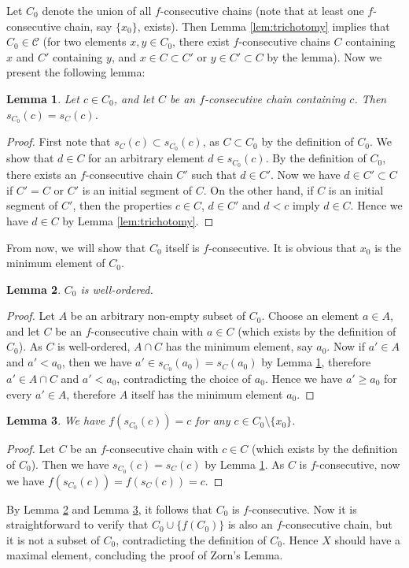 \documentclass{article}
\newtheorem{lemma}{Lemma}
\begin{document}
Let $C_0$ denote the union of all $f$-consecutive chains (note that at least one $f$-consecutive chain, say $\{x_0\}$, exists).
Then Lemma \ref{lem:trichotomy} implies that $C_0 \in \mathcal{C}$ (for two elements $x,y \in C_0$, there exist $f$-consecutive chains $C$ containing $x$ and $C'$ containing $y$, and $x \in C \subset C'$ or $y \in C' \subset C$ by the lemma).
Now we present the following lemma:
\begin{lemma}
\label{lem:relation_of_initial_segments}
Let $c \in C_0$, and let $C$ be an $f$-consecutive chain containing $c$.
Then $s_{C_0}(c) = s_C(c)$.
\end{lemma}
\begin{proof}
First note that $s_C(c) \subset s_{C_0}(c)$, as $C \subset C_0$ by the definition of $C_0$.
We show that $d \in C$ for an arbitrary element $d \in s_{C_0}(c)$.
By the definition of $C_0$, there exists an $f$-consecutive chain $C'$ such that $d \in C'$.
Now we have $d \in C' \subset C$ if $C' = C$ or $C'$ is an initial segment of $C$.
On the other hand, if $C$ is an initial segment of $C'$, then the properties $c \in C$, $d \in C'$ and $d < c$ imply $d \in C$.
Hence we have $d \in C$ by Lemma \ref{lem:trichotomy}.
\end{proof}
From now, we will show that $C_0$ itself is $f$-consecutive.
It is obvious that $x_0$ is the minimum element of $C_0$.
\begin{lemma}
\label{lem:union_is_well-ordered}
$C_0$ is well-ordered.
\end{lemma}
\begin{proof}
Let $A$ be an arbitrary non-empty subset of $C_0$.
Choose an element $a \in A$, and let $C$ be an $f$-consecutive chain with $a \in C$ (which exists by the definition of $C_0$).
As $C$ is well-ordered, $A \cap C$ has the minimum element, say $a_0$.
Now if $a' \in A$ and $a' < a_0$, then we have $a' \in s_{C_0}(a_0) = s_C(a_0)$ by Lemma \ref{lem:relation_of_initial_segments}, therefore $a' \in A \cap C$ and $a' < a_0$, contradicting the choice of $a_0$.
Hence we have $a' \geq a_0$ for every $a' \in A$, therefore $A$ itself has the minimum element $a_0$.
\end{proof}
\begin{lemma}
\label{lem:union_is_closed}
We have $f(s_{C_0}(c)) = c$ for any $c \in C_0 \setminus \{x_0\}$.
\end{lemma}
\begin{proof}
Let $C$ be an $f$-consecutive chain with $c \in C$ (which exists by the definition of $C_0$).
Then we have $s_{C_0}(c) = s_C(c)$ by Lemma \ref{lem:relation_of_initial_segments}.
As $C$ is $f$-consecutive, now we have $f(s_{C_0}(c)) = f(s_C(c)) = c$.
\end{proof}
By Lemma \ref{lem:union_is_well-ordered} and Lemma \ref{lem:union_is_closed}, it follows that $C_0$ is $f$-consecutive.
Now it is straightforward to verify that $C_0 \cup \{f(C_0)\}$ is also an $f$-consecutive chain, but it is not a subset of $C_0$, contradicting the definition of $C_0$.
Hence $X$ should have a maximal element, concluding the proof of Zorn's Lemma.
\end{document}
